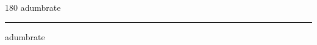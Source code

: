 
\begin{frame}
\begin{center}
\begin{turn}{180}
{\fontsize{2.5cm}{1em}\selectfont adumbrate}
\end{turn}
\vspace{1em}\par  
\hrule
\vspace{1em}\par  
{\fontsize{2.5cm}{1em}\selectfont adumbrate}
\end{center}
\end{frame}
